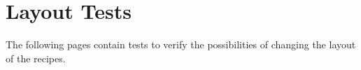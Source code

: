 \documentclass[%
a4paper,
11pt
]{article}
\begin{document}







\section{Layout Tests}
The following pages contain tests to verify the possibilities of changing the layout of the recipes.












%
\end{document}

